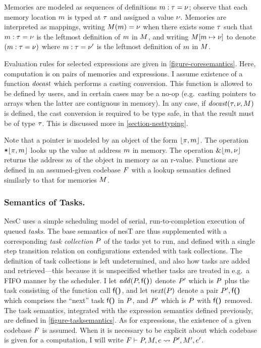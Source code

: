Memories are modeled as sequences of definitions $m : \tau = {\nu}$; observe that each memory
location $m$ is typed at $\tau$ and assigned a value ${\nu}$. Memories are interpreted as
mappings, writing $M(m) = {\nu}$ when there exists some $\tau$ such that $m : \tau = {\nu}$
is the leftmost definition of $m$ in $M$, and writing $M[m \mapsto {\nu}]$ to
denote $(m : \tau = {\nu})$ where $m : \tau = {\nu}'$ is the leftmost definition of $m$ in
$M$.

Evaluation rules for selected expressions are given in \autoref{figure-coresemantics}. Here,
computation is on pairs of memories and expressions. I assume existence of a function
$\mathit{docast}$ which performs a casting conversion. This function is allowed to be defined by
users, and in certain cases may be a no-op (e.g.~casting pointers to arrays when the latter are
contiguous in memory). In any case, if $\mathit{docast}(\tau,{\nu},M)$ is defined, the cast
conversion is required to be type safe, in that the result must be of type $\tau$. This is
discussed more in \autoref{section-nesttyping}.

Note that a pointer is modeled by an object of the form $\lfloor \pi,m \rfloor$. The operation
$\texttt{*}\lfloor \pi,m \rfloor$ looks up the value at address $m$ in memory. The operation
$\&\lfloor m,{\nu} \rfloor$ returns the address $m$ of the object in memory as an r-value. Functions
are defined in an assumed-given codebase $F$ with a lookup semantics defined similarly to
that for memories $M$.

\bootloadsemanticsfig

\subsubsection{Semantics of Tasks.}
NesC uses a simple scheduling model of serial, run-to-completion execution of queued
\emph{tasks}. The base semantics of nesT are thus supplemented with a corresponding \emph{task
  collection} $P$ of the tasks yet to run, and defined with a single step transition
relation on configurations extended with task collections. The definition of task collections is
left undetermined, and also how tasks are added and retrieved---this because it is unspecified
whether tasks are treated in e.g.~a FIFO manner by the scheduler. I let
$\mathit{add}(P,\textsf{f}\textbf{(}\textbf{)})$ denote $P'$ which is $P$ plus the task consisting of the
function call $\textsf{f}\textbf{(}\textbf{)}$, and let $\mathit{next}(P)$ denote a pair $P',\textsf{f}\textbf{(}\textbf{)}$
which comprises the ``next'' task $\textsf{f}\textbf{(}\textbf{)}$ in $P$, and $P'$ which is $P$
with $\textsf{f}\textbf{(}\textbf{)}$ removed. The task semantics, integrated with the expression semantics
defined previously, are defined in \autoref{figure-tasksemantics}. As for expressions, the
existence of a given codebase $F$ is assumed. When it is necessary to be explicit about
which codebase is given for a computation, I will write $F \vdash P, M, e \leadsto
P', M', e'$.

